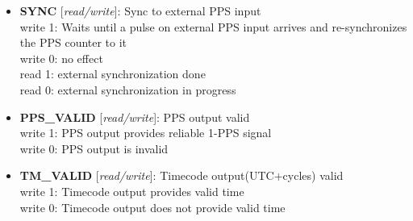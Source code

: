 \vspace{12pt}
\noindent
{}

\begin{itemize}
\item \begin{small}
{\bf 
SYNC
} [\emph{read/write}]: Sync to external PPS input
\\
write 1: Waits until a pulse on external PPS input arrives and re-synchronizes the PPS counter to it\\				 write 0: no effect\\				 read 1: external synchronization done\\				 read 0: external synchronization in progress
\end{small}
\item \begin{small}
{\bf 
PPS\_VALID
} [\emph{read/write}]: PPS output valid
\\
write 1: PPS output provides reliable 1-PPS signal\\                        write 0: PPS output is invalid
\end{small}
\item \begin{small}
{\bf 
TM\_VALID
} [\emph{read/write}]: Timecode output(UTC+cycles) valid
\\
write 1: Timecode output provides valid time\\                        write 0: Timecode output does not provide valid time
\end{small}
\end{itemize}



